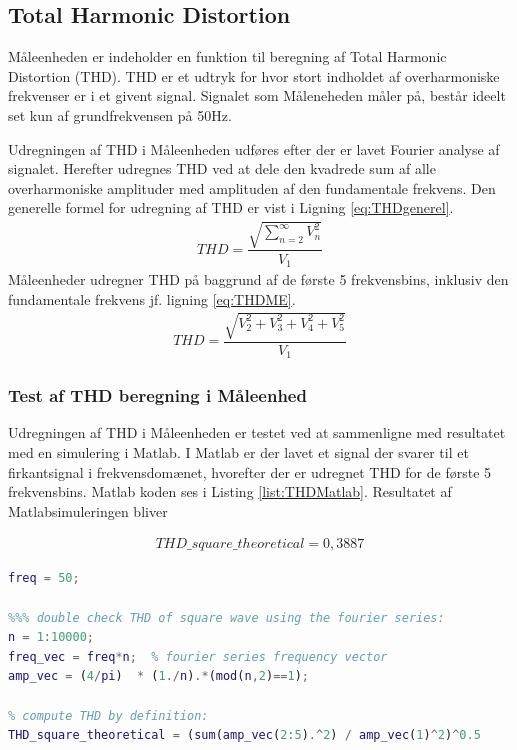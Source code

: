 
\subsection{Total Harmonic Distortion}

Måleenheden er indeholder en funktion til beregning af Total Harmonic Distortion (THD). THD er et udtryk for hvor stort indholdet af overharmoniske frekvenser er i et givent signal. Signalet som Måleneheden måler på, består ideelt set kun af grundfrekvensen på 50Hz. 

Udregningen af THD i Måleenheden udføres efter der er lavet Fourier analyse af signalet. Herefter udregnes THD ved at dele den kvadrede sum af alle overharmoniske amplituder med amplituden af den fundamentale frekvens. Den generelle formel for udregning af THD er vist i Ligning \ref{eq:THDgenerel}.
\begin{align}
	THD = \dfrac{\sqrt{\sum_{n=2}^{\infty}V_n^{2}}}{V_{1}}
	\label{eq:THDgenerel}
\end{align}
Måleenheder udregner THD på baggrund af de første 5 frekvensbins, inklusiv den fundamentale frekvens jf. ligning \ref{eq:THDME}.
\begin{align}
THD = \dfrac{\sqrt{V_2^{2}+V_3^{2}+V_4^{2}+V_5^{2}}}{V_{1}}
\label{eq:THDME}
\end{align}

\subsubsection{Test af THD beregning i Måleenhed}
Udregningen af THD i Måleenheden er testet ved at sammenligne med resultatet med en simulering i Matlab. I Matlab er der lavet et signal der svarer til et firkantsignal i frekvensdomænet, hvorefter der er udregnet THD for de første 5 frekvensbins. Matlab koden ses i Listing \ref{list:THDMatlab}. Resultatet af Matlabsimuleringen bliver

\begin{align}
	THD\_square\_theoretical = 0,3887
\end{align}



\begin{lstlisting}[language=Matlab] 
freq = 50;

%%% double check THD of square wave using the fourier series:
n = 1:10000;
freq_vec = freq*n;  % fourier series frequency vector
amp_vec = (4/pi)  * (1./n).*(mod(n,2)==1);

% compute THD by definition:
THD_square_theoretical = (sum(amp_vec(2:5).^2) / amp_vec(1)^2)^0.5
\end{lstlisting}


